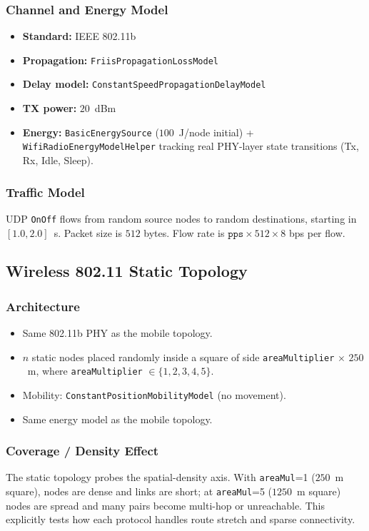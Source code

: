 \documentclass[11pt,a4paper]{article}
\begin{document}
\subsubsection{Channel and Energy Model}
\begin{itemize}
    \item \textbf{Standard:} IEEE 802.11b
    \item \textbf{Propagation:} \texttt{FriisPropagationLossModel}
    \item \textbf{Delay model:} \texttt{ConstantSpeedPropagationDelayModel}
    \item \textbf{TX power:} $20$~dBm
    \item \textbf{Energy:} \texttt{BasicEnergySource} ($100$~J/node initial)
          + \texttt{WifiRadioEnergyModelHelper} tracking real PHY-layer state
          transitions (Tx, Rx, Idle, Sleep).
\end{itemize}

\subsubsection{Traffic Model}
UDP \texttt{OnOff} flows from random source nodes to random destinations,
starting in $[1.0,2.0]$~s. Packet size is $512$ bytes. Flow rate is
$\texttt{pps}\times512\times8$ bps per flow.

\subsection{Wireless 802.11 Static Topology}

\subsubsection{Architecture}
\begin{itemize}
    \item Same 802.11b PHY as the mobile topology.
    \item $n$ static nodes placed randomly inside a square of side
          \texttt{areaMultiplier} $\times$ $250$~m, where
          \texttt{areaMultiplier} $\in \{1,2,3,4,5\}$.
    \item Mobility: \texttt{ConstantPositionMobilityModel} (no movement).
    \item Same energy model as the mobile topology.
\end{itemize}

\subsubsection{Coverage / Density Effect}
The static topology probes the spatial-density axis. With \texttt{areaMul}=1
($250$~m square), nodes are dense and links are short; at \texttt{areaMul}=5
($1250$~m square) nodes are spread and many pairs become multi-hop or
unreachable. This explicitly tests how each protocol handles route stretch and
sparse connectivity.
\end{document}
